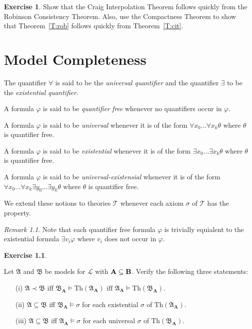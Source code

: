 \documentclass[titlepage, oneside]{amsbook}
\theoremstyle{plain}
\theoremstyle{definition}
\newtheorem{exercise}{Exercise}
\theoremstyle{remark}
\newtheorem*{rem}{Remark}
\newcommand{\Th}{\ensuremath{\mbox{Th}}}
\newcommand{\lan}{\ensuremath{\mathcal{L}}}
\newcommand{\ma}{\ensuremath{\mathfrak{A}}}
\newcommand{\mb}{\ensuremath{\mathfrak{B}}}
\newcommand{\masb}{\ensuremath{\mathfrak{A} \subseteq \mathfrak{B}}}
\newcommand{\asb}{\ensuremath{\bf A \subseteq \bf B}}
\newcommand{\ba}{\ensuremath{\mathbf{A}}}
\begin{document}
\begin{exercise} Show that the Craig Interpolation Theorem follows quickly
from the Robinson Consistency Theorem. Also, use the Compactness
Theorem
to show that
Theorem~\ref{T:rob} follows quickly from Theorem~\ref{T:cit}.
\end{exercise}

\chapter{Model Completeness}


The quantifier $\forall$ is said to be the \emph{universal
quantifier} and the quantifier $\exists$ to be the \emph{existential
quantifier}.



A formula $\varphi $ is said to be \emph{ quantifier free } whenever no 
quantifiers occur in $\varphi $.

A formula $\varphi$ is said to be \emph{universal} whenever it is of
the form $\forall x_{0} \dots \forall x_{k} \theta$ where
$\theta$ is
quantifier free.

A formula $\varphi$ is said to be \emph{existential} whenever it is of
the form $\exists x_0 \dots \exists x_k \theta$ where $\theta$ is
quantifier free.  



A formula  $\varphi $ is said to be \emph{ universal-existensial}
whenever it is 
of the form $\forall x_{0} \dots \forall x_{k} \exists y_{0} \dots
\exists y_{k} \theta $ where $\theta $ is quantifier free.

We extend these notions to theories $\mathcal{T} $ whenever each axiom
$\sigma$ of $\mathcal{T} $ has the property.

\begin{rem} Note that each quantifier free formula $\varphi$ is 
trivially
equialent to the existential formula $\exists v_i \varphi$ where $v_i$
does not occur in $\varphi$.
\end{rem}

\begin{exercise}\label{X:verify}
 
Let $\ma$ and $\mb$ be models for $\lan$ with $\asb$. Verify the
following three statements:
\begin{itemize}
\item[(i)] $\ma \prec \mb \mbox{ iff }\mb_\ba \models \Th (\ma_\ba)
\mbox{ iff } \ma_\ba \models \Th (\mb_\ba).$

\item[(ii)] $\masb$ iff $\mb_\ba \models \sigma$ for each existential
$\sigma$ of $\Th (\ma_\ba).$

\item[(iii)] $\masb$ iff $\ma_\ba \models \sigma$ for each universal
$\sigma$ of $\Th ( \mb_\ba).$

\end{itemize}

\end{exercise}
\end{document}
